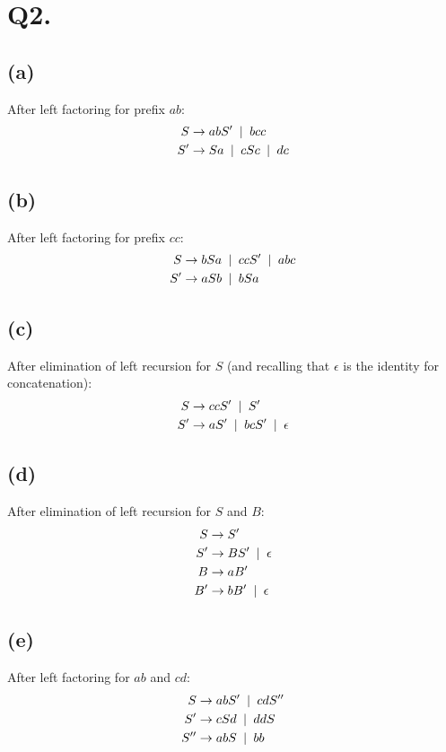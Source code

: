 \documentclass{article}
\begin{document}
	\section*{Q2.}
	\subsection*{(a)}
	After left factoring for prefix $ab$:
		\begin{align*}
			S &\rightarrow abS' \hphantom{a} | \hphantom{a} bcc\\
			S' &\rightarrow Sa \hphantom{a} | \hphantom{a} cSc \hphantom{a} | \hphantom{a} dc
		\end{align*}
	\subsection*{(b)}
	After left factoring for prefix $cc$:
		\begin{align*}
			S &\rightarrow bSa \hphantom{a} | \hphantom{a} ccS' \hphantom{a} | \hphantom{a} abc\\
			S' &\rightarrow aSb \hphantom{a} | \hphantom{a} bSa
		\end{align*}
	\subsection*{(c)}
	After elimination of left recursion for $S$ (and recalling that $\epsilon$ is the identity for concatenation):
		\begin{align*}
			S &\rightarrow ccS' \hphantom{a} | \hphantom{a} S'\\
			S' &\rightarrow aS' \hphantom{a} | \hphantom{a} bcS' \hphantom{a} | \hphantom{a} \epsilon
		\end{align*}
	\subsection*{(d)}
	After elimination of left recursion for $S$ and $B$:
		\begin{align*}
			S &\rightarrow S'\\
			S' &\rightarrow BS' \hphantom{a} | \hphantom{a} \epsilon\\
			B &\rightarrow aB'\\
			B' &\rightarrow bB' \hphantom{a} | \hphantom{a} \epsilon
		\end{align*}
	\subsection*{(e)}
	After left factoring for $ab$ and $cd$:
		\begin{align*}
			S &\rightarrow abS' \hphantom{a} | \hphantom{a} cdS''\\
			S' &\rightarrow cSd \hphantom{a} | \hphantom{a} ddS\\
			S'' &\rightarrow abS \hphantom{a} | \hphantom{a} bb
		\end{align*}
\end{document}
